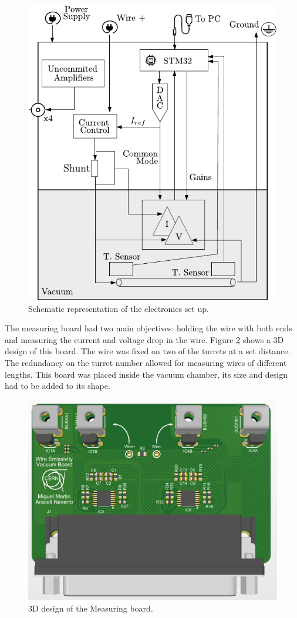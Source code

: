 \begin{figure}[h]
    \centering
    \includegraphics[width=0.65\columnwidth]{ElectronicSchema/ElectronicSchema.pdf}
    \caption{Schematic representation of the electronics set up. }
    \label{fig:SchemaElectronics}
\end{figure}

The measuring board had two main objectives: holding the wire with both ends and measuring the current and voltage drop in the wire. Figure \ref{fig:MeasuringBoard} shows a 3D design of this board. The wire was fixed on two of the turrets at a set distance. The redundancy on the turret number allowed for measuring wires of different lengths. This board was placed inside the vacuum chamber, its size and design had to be added to its shape. 

\begin{figure}[h]
    \centering
    \includegraphics[width=0.5\columnwidth]{3DBoardDesigns/MeasuringBoard.png}
    \caption{3D design of the Measuring board.}
    \label{fig:MeasuringBoard}
\end{figure}

